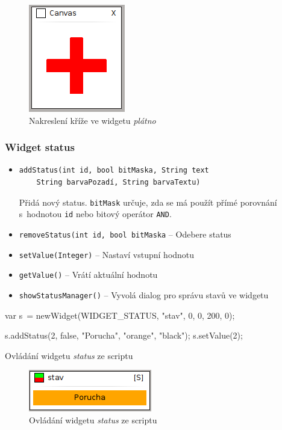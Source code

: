 \documentclass[12pt, a4paper, oneside]{article}
\newcommand{\It}{\textit}  %
\begin{document}
\begin{figure}[H]
\begin{center}
\includegraphics[scale=1]{img/w_canvas.png}
\caption{Nakreslení kříže ve widgetu \It{plátno}}
\end{center}
\end{figure}

\subsubsection*{Widget status}
\begin{itemize}
    \item {\color{blue}
    \begin{verbatim}addStatus(int id, bool bitMaska, String text
    String barvaPozadí, String barvaTextu)
    \end{verbatim}} Přidá nový status. \verb|bitMask| určuje, zda se má použít přímé porovnání s~hodnotou \verb|id| nebo bitový operátor \verb|AND|.
    \item {\color{blue}\verb/removeStatus(int id, bool bitMaska/} -- Odebere status
    \item {\color{blue}\verb/setValue(Integer)/} -- Nastaví vstupní hodnotu
    \item {\color{blue}\verb/getValue()/} -- Vrátí aktuální hodnotu
    \item {\color{blue}\verb/showStatusManager()/} -- Vyvolá dialog pro správu stavů ve widgetu
\end{itemize}

\begin{listing}[H]
\begin{jscode}
var s~= newWidget(WIDGET_STATUS, "stav", 0, 0, 200, 0);

s.addStatus(2, false, "Porucha", "orange", "black");
s.setValue(2);
\end{jscode}
\caption{Ovládání widgetu \It{status} ze scriptu}
\end{listing}

\begin{figure}[H]
\begin{center}
\includegraphics[scale=1]{img/status_script.png}
\caption{Ovládání widgetu \It{status} ze scriptu}
\end{center}
\end{figure}
\end{document}
